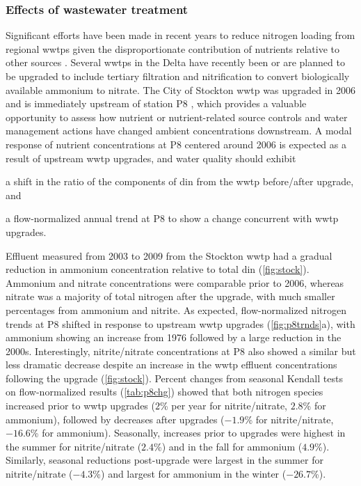 \documentclass[letterpaper,12pt,oneside]{article}\usepackage[]{graphicx}\usepackage[]{color}
\begin{document}
\subsubsection{Effects of wastewater treatment}

Significant efforts have been made in recent years to reduce nitrogen loading from regional \acp{wwtp} given the disproportionate contribution of nutrients relative to other sources  \citep{Cornwell14,Novick15}.  Several \acp{wwtp} in the Delta have recently been or are planned to be upgraded to include tertiary filtration and nitrification to convert biologically available ammonium to nitrate. The City of Stockton \ac{wwtp} was upgraded in 2006 and is immediately upstream of station P8 \citep{Jabusch16}, which provides a valuable opportunity to assess how nutrient or nutrient-related source controls and water management actions have changed ambient concentrations downstream. A modal response of nutrient concentrations at P8 centered around 2006 is expected as a result of upstream \ac{wwtp} upgrades, and water quality should exhibit \begin{inparaenum}[1\upshape)]
\item a shift in the ratio of the components of \ac{din} from the \ac{wwtp} before/after upgrade, and
\item a flow-normalized annual trend at P8 to show a change concurrent with \ac{wwtp} upgrades.
\end{inparaenum}



Effluent measured from 2003 to 2009 from the Stockton \ac{wwtp} had a gradual reduction in ammonium concentration relative to total \ac{din} (\cref{fig:stock}).  Ammonium and nitrate concentrations were comparable prior to 2006, whereas nitrate was a majority of total nitrogen after the upgrade, with much smaller percentages from ammonium and nitrite. As expected, flow-normalized nitrogen trends at P8 shifted in response to upstream \ac{wwtp} upgrades (\cref{fig:p8trnds}a), with ammonium showing an increase from 1976 followed by a large reduction in the 2000s.  Interestingly, nitrite/nitrate concentrations at P8 also showed a similar but less dramatic decrease despite an increase in the \ac{wwtp} effluent concentrations following the upgrade (\cref{fig:stock}).  Percent changes from seasonal Kendall tests on flow-normalized results (\cref{tab:p8chg}) showed that both nitrogen species increased prior to \ac{wwtp} upgrades ($2$\% per year for nitrite/nitrate, $2.8$\% for ammonium), followed by decreases after upgrades ($-1.9$\% for nitrite/nitrate, $-16.6$\% for ammonium).  Seasonally, increases prior to upgrades were highest in the summer for nitrite/nitrate ($2.4$\%) and in the fall for ammonium ($4.9$\%). Similarly, seasonal reductions post-upgrade were largest in the summer for nitrite/nitrate ($-4.3$\%) and largest for ammonium in the winter ($-26.7$\%).
\end{document}
